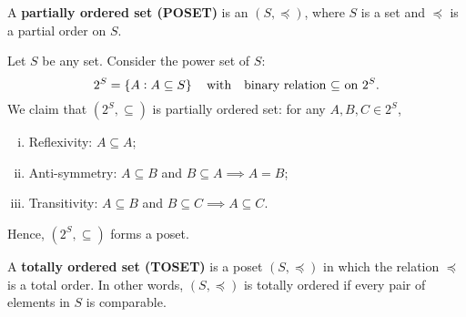 \documentclass[11pt,openany]{article}
\begin{document}
\newpage
{}
\begin{note}
	A \colorbox{-red}{\textbf{partially ordered set (POSET)}} is an $(S,\preceq)$, where $S$ is a set and $\preceq$ is a partial order on $S$.
\end{note}
\begin{example*}
	Let $S$ be any set. Consider the power set of $S$: \[
	2^S=\set{A:A\subseteq S}\quad\text{with}\quad\text{binary relation $\subseteq$ on $2^S$}.
	\] We claim that $(2^S,\subseteq)$ is partially ordered set: for any $A,B,C\in 2^S$,\begin{enumerate}[(i)]
		\item Reflexivity: $A\subseteq A$;
		\item Anti-symmetry: $A\subseteq B$ and $B\subseteq A\implies A=B$;
		\item Transitivity: $A\subseteq B$ and $B\subseteq C\implies A\subseteq C$.
	\end{enumerate}
	Hence, $(2^S,\subseteq)$ forms a poset.
\end{example*}
\vfill
{}
\begin{note}
	A \colorbox{-red}{\textbf{totally ordered set (TOSET)}} is a poset $(S,\preceq)$ in which the relation $\preceq$ is a total order. In other words, $(S,\preceq)$ is totally ordered if every pair of elements in $S$ is comparable.
\end{note}
\end{document}
